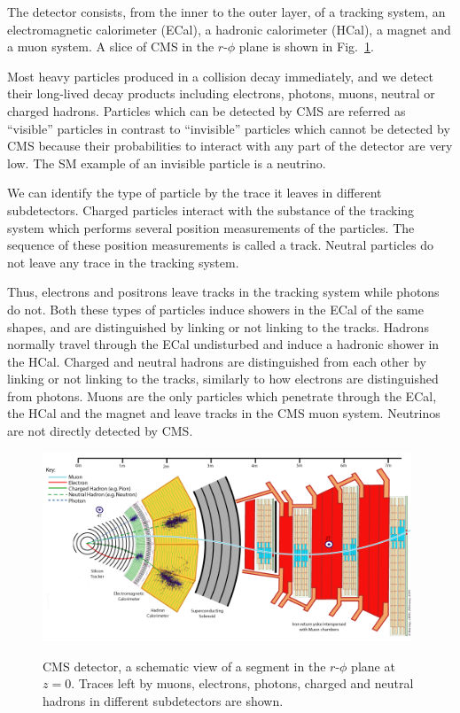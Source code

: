 The detector consists, from the inner to the outer layer,  of a tracking system, an electromagnetic calorimeter (ECal), a hadronic calorimeter (HCal), a magnet and a muon system. A slice of CMS in the $r$-$\phi$ plane is shown in Fig.~\ref{fig:CMS_slice}.

Most heavy particles produced in a collision decay immediately, and we detect their long-lived decay products including electrons, photons, muons, neutral or charged hadrons. Particles which can be detected by CMS are referred as ``visible'' particles in contrast to ``invisible'' particles which cannot be detected by CMS because their probabilities to interact with any part of the detector are very low. The SM example of an invisible particle is a neutrino.

We can identify the type of particle by the trace it leaves in different subdetectors. Charged particles interact with the substance of the tracking system which performs several position measurements of the particles. The sequence of these position measurements is called a track. Neutral particles do not leave any trace in the tracking system. 

Thus, electrons and positrons leave tracks in the tracking system while photons do not. Both these types of particles induce showers in the ECal of the same shapes, and are distinguished by linking or not linking to the tracks. Hadrons normally travel through the ECal undisturbed and induce a hadronic shower in the HCal. Charged and neutral hadrons are distinguished from each other by linking or not linking to the tracks, similarly to how electrons are distinguished from photons. Muons are the only particles which penetrate through the ECal, the HCal and the magnet and leave tracks in the CMS muon system. Neutrinos are not directly detected by CMS.   

\clearpage

\begin{figure}[htb]
  \begin{center}
    {\includegraphics[width=0.98\textwidth]{../figs/Exp/CMS_Slice.png}}
    \caption{CMS detector, a schematic view of a segment in the $r$-$\phi$ plane at $z=0$. Traces left by muons, electrons, photons, charged and neutral hadrons in different subdetectors are shown.}
    \label{fig:CMS_slice}
  \end{center}
\end{figure}


